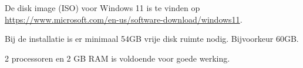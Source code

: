 De disk image (ISO) voor Windows 11 is te vinden op \url{https://www.microsoft.com/en-us/software-download/windows11}.

Bij de installatie is er minimaal 54GB vrije disk ruimte nodig. Bijvoorkeur 60GB.

2 processoren en 2 GB RAM is voldoende voor goede werking.

